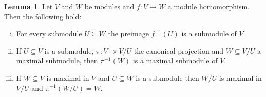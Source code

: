 \documentclass[a4paper,10pt]{article}
\theoremstyle{definition}
\newtheorem{lem}[own]{Lemma}
\begin{document}
\begin{lem}\label{lem:cool}
 Let $V$ and $W$ be modules and $f : V \rightarrow W$ a module homomorphism. Then the following hold:
 \begin{enumerate}[i)]
  \item For every submodule $U \subseteq W$ the preimage $f^{-1}(U)$ is a submodule of $V$. \label{lem:urbild}
  \item If $U \subseteq V$ is a submodule, $\pi : V \twoheadrightarrow V\!/U$ the canonical projection and $W \subseteq V\!/U$ a maximal submodule, then $\pi^{-1}(W)$ is a maximal submodule of $V$. \label{lem:urbildmax}
  \item If $W \subseteq V$ is maximal in $V$ and $U \subseteq W$ is a submodule then $W\!/U$ is maximal in $V\!/U$ and $\pi^{-1}(W\!/U) = W$. \label{lem:bildmax}
 \end{enumerate}
\end{lem}
\end{document}
